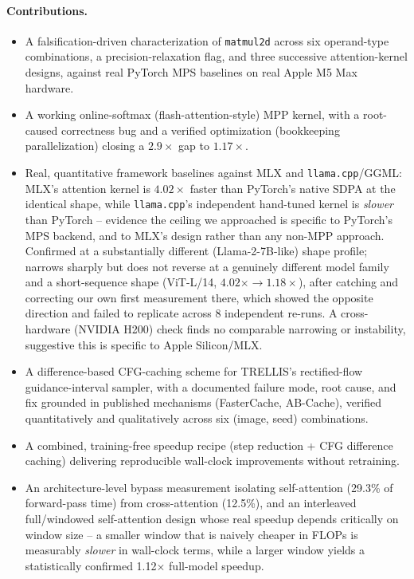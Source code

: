 \documentclass{article}
\newcommand{\code}[1]{\texttt{#1}}
\begin{document}
\paragraph{Contributions.}
\begin{itemize}
    \item A falsification-driven characterization of \code{matmul2d} across six operand-type
    combinations, a precision-relaxation flag, and three successive attention-kernel designs,
    against real PyTorch MPS baselines on real Apple M5 Max hardware.
    \item A working online-softmax (flash-attention-style) MPP kernel, with a root-caused
    correctness bug and a verified optimization (bookkeeping parallelization) closing a
    $2.9\times$ gap to $1.17\times$.
    \item Real, quantitative framework baselines against MLX and \code{llama.cpp}/GGML: MLX's
    attention kernel is $4.02\times$ faster than PyTorch's native SDPA at the identical shape,
    while \code{llama.cpp}'s independent hand-tuned kernel is \emph{slower} than PyTorch --
    evidence the ceiling we approached is specific to PyTorch's MPS backend, and to MLX's design
    rather than any non-MPP approach. Confirmed at a substantially different (Llama-2-7B-like)
    shape profile; narrows sharply but does not reverse at a genuinely different model family and
    a short-sequence shape (ViT-L/14, $4.02\times \to 1.18\times$), after catching and correcting
    our own first measurement there, which showed the opposite direction and failed to replicate
    across 8 independent re-runs. A cross-hardware (NVIDIA H200) check finds no comparable
    narrowing or instability, suggestive this is specific to Apple Silicon/MLX.
    \item A difference-based CFG-caching scheme for TRELLIS's rectified-flow guidance-interval
    sampler, with a documented failure mode, root cause, and fix grounded in published mechanisms
    (FasterCache, AB-Cache), verified quantitatively and qualitatively across six (image, seed)
    combinations.
    \item A combined, training-free speedup recipe (step reduction + CFG difference caching)
    delivering reproducible wall-clock improvements without retraining.
    \item An architecture-level bypass measurement isolating self-attention (29.3\% of
    forward-pass time) from cross-attention (12.5\%), and an interleaved full/windowed
    self-attention design whose real speedup depends critically on window size -- a smaller
    window that is naively cheaper in FLOPs is measurably \emph{slower} in wall-clock terms, while
    a larger window yields a statistically confirmed 1.12$\times$ full-model speedup.
\end{itemize}
\end{document}
